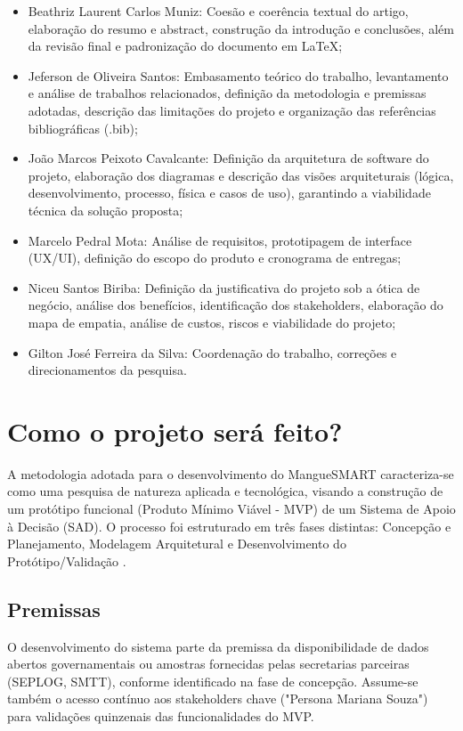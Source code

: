 \documentclass[12pt]{article}
\begin{document}
\begin{itemize}
  \item Beathriz Laurent Carlos Muniz: Coesão e coerência textual do artigo, elaboração do resumo e abstract, construção da introdução e conclusões, além da revisão final e padronização do documento em LaTeX;
  \item Jeferson de Oliveira Santos: Embasamento teórico do trabalho, levantamento e análise de trabalhos relacionados, definição da metodologia e premissas adotadas, descrição das limitações do projeto e organização das referências bibliográficas (.bib);
  \item João Marcos Peixoto Cavalcante: Definição da arquitetura de software do projeto, elaboração dos diagramas e descrição das visões arquiteturais (lógica, desenvolvimento, processo, física e casos de uso), garantindo a viabilidade técnica da solução proposta;
  \item Marcelo Pedral Mota: Análise de requisitos, prototipagem de interface (UX/UI), definição do escopo do produto e cronograma de entregas;
  \item Niceu Santos Biriba: Definição da justificativa do projeto sob a ótica de negócio, análise dos benefícios, identificação dos stakeholders, elaboração do mapa de empatia, análise de custos, riscos e viabilidade do projeto;
  \item Gilton José Ferreira da Silva: Coordenação do trabalho, correções e direcionamentos da pesquisa.
\end{itemize}

\section{Como o projeto será feito?} \label{sec:Como}

A metodologia adotada para o desenvolvimento do MangueSMART caracteriza-se como uma pesquisa de natureza aplicada e tecnológica, visando a construção de um protótipo funcional (Produto Mínimo Viável - MVP) de um Sistema de Apoio à Decisão (SAD). O processo foi estruturado em três fases distintas: Concepção e Planejamento, Modelagem Arquitetural e Desenvolvimento do Protótipo/Validação \cite{SAD2025}.

\subsection{Premissas}
O desenvolvimento do sistema parte da premissa da disponibilidade de dados abertos governamentais ou amostras fornecidas pelas secretarias parceiras (SEPLOG, SMTT), conforme identificado na fase de concepção. Assume-se também o acesso contínuo aos stakeholders chave ("Persona Mariana Souza") para validações quinzenais das funcionalidades do MVP.
\end{document}
